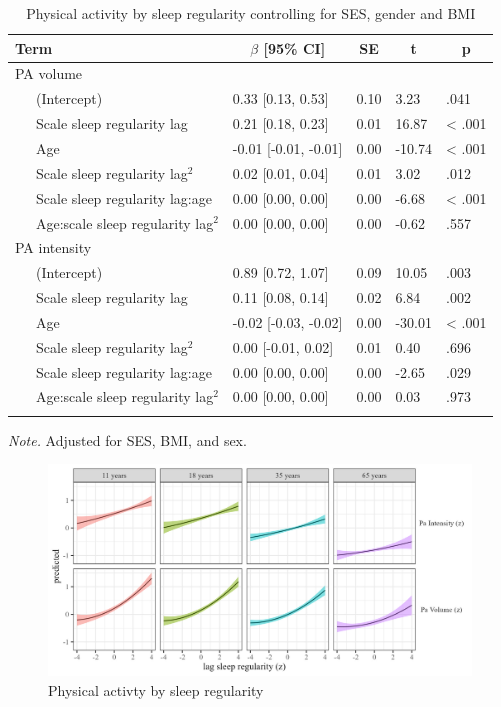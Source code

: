 \documentclass[
  man]{apa6}
\begin{document}
\begin{table}[tbp]

\begin{center}
\begin{threeparttable}

\caption{\label{tab:PA-by-sleep-regularity}Physical activity by sleep regularity controlling for SES, gender and BMI}

\begin{tabular}{lllll}
\toprule
Term & \multicolumn{1}{c}{$\beta$ [95\% CI]} & \multicolumn{1}{c}{SE} & \multicolumn{1}{c}{t} & \multicolumn{1}{c}{p}\\
\midrule
PA volume &  &  &  & \\
\ \ \ (Intercept) & 0.33 [0.13, 0.53] & 0.10 & 3.23 & .041\\
\ \ \ Scale sleep regularity lag & 0.21 [0.18, 0.23] & 0.01 & 16.87 & < .001\\
\ \ \ Age & -0.01 [-0.01, -0.01] & 0.00 & -10.74 & < .001\\
\ \ \ Scale sleep regularity lag$^2$ & 0.02 [0.01, 0.04] & 0.01 & 3.02 & .012\\
\ \ \ Scale sleep regularity lag:age & 0.00 [0.00, 0.00] & 0.00 & -6.68 & < .001\\
\ \ \ Age:scale sleep regularity lag$^2$ & 0.00 [0.00, 0.00] & 0.00 & -0.62 & .557\\
PA intensity &  &  &  & \\
\ \ \ (Intercept) & 0.89 [0.72, 1.07] & 0.09 & 10.05 & .003\\
\ \ \ Scale sleep regularity lag & 0.11 [0.08, 0.14] & 0.02 & 6.84 & .002\\
\ \ \ Age & -0.02 [-0.03, -0.02] & 0.00 & -30.01 & < .001\\
\ \ \ Scale sleep regularity lag$^2$ & 0.00 [-0.01, 0.02] & 0.01 & 0.40 & .696\\
\ \ \ Scale sleep regularity lag:age & 0.00 [0.00, 0.00] & 0.00 & -2.65 & .029\\
\ \ \ Age:scale sleep regularity lag$^2$ & 0.00 [0.00, 0.00] & 0.00 & 0.03 & .973\\
\bottomrule
\addlinespace
\end{tabular}

\begin{tablenotes}[para]
\normalsize{\textit{Note.} Adjusted for SES, BMI, and sex. }
\end{tablenotes}

\end{threeparttable}
\end{center}

\end{table}

\begin{figure}
\includegraphics[width=7.08in]{../Figures/Pa on sleep_regularity_lag} \caption{Physical activty by sleep regularity}\label{fig:PA-by-sleep-regularity-fig}
\end{figure}
\end{document}
